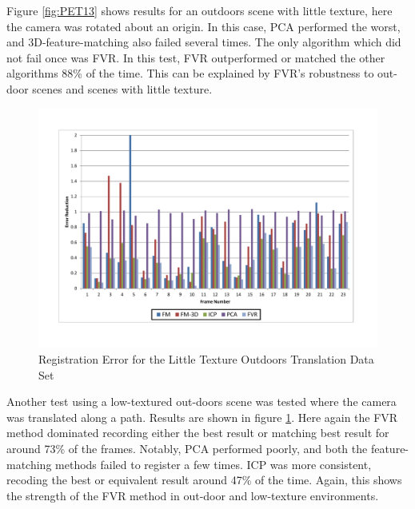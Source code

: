 Figure \ref{fig:PET13} shows results for an outdoors scene with little texture, here the camera was rotated about an origin. In this case, PCA performed the worst, and 3D-feature-matching also failed several times. The only algorithm which did not fail once was FVR. In this test, FVR outperformed or matched the other algorithms 88\% of the time. This can be explained by FVR's robustness to out-door scenes and scenes with little texture. 

\begin{figure}[t]
\centering
\includegraphics[width=6.0in]{images/results/Outside_No_Texture_Translation}
\caption{Registration Error for the Little Texture Outdoors Translation Data Set}
\label{fig:PET14}
\end{figure}

Another test using a low-textured out-doors scene was tested where the camera was translated along a path. Results are shown in figure \ref{fig:PET14}. Here again the FVR method dominated recording either the best result or matching best result for around 73\% of the frames. Notably, PCA performed poorly, and both the feature-matching methods failed to register a few times. ICP was more consistent, recoding the best or equivalent result around 47\% of the time. Again, this shows the strength of the FVR method in out-door and low-texture environments. 

